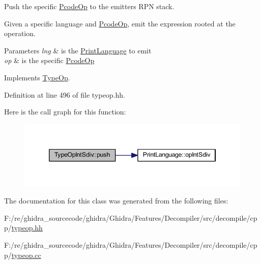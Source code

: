 Push the specific \mbox{\hyperlink{class_pcode_op}{Pcode\+Op}} to the emitter\textquotesingle{}s R\+PN stack. 

Given a specific language and \mbox{\hyperlink{class_pcode_op}{Pcode\+Op}}, emit the expression rooted at the operation. 
\begin{DoxyParams}{Parameters}
{\em lng} & is the \mbox{\hyperlink{class_print_language}{Print\+Language}} to emit \\
\hline
{\em op} & is the specific \mbox{\hyperlink{class_pcode_op}{Pcode\+Op}} \\
\hline
\end{DoxyParams}


Implements \mbox{\hyperlink{class_type_op_ac9c9544203ed74dabe6ac662b653b2af}{Type\+Op}}.



Definition at line 496 of file typeop.\+hh.

Here is the call graph for this function\+:
\nopagebreak
\begin{figure}[H]
\begin{center}
\leavevmode
\includegraphics[width=346pt]{class_type_op_int_sdiv_af19cd2db72cf1781f488d2a8c930b015_cgraph}
\end{center}
\end{figure}


The documentation for this class was generated from the following files\+:\begin{DoxyCompactItemize}
\item 
F\+:/re/ghidra\+\_\+sourcecode/ghidra/\+Ghidra/\+Features/\+Decompiler/src/decompile/cpp/\mbox{\hyperlink{typeop_8hh}{typeop.\+hh}}\item 
F\+:/re/ghidra\+\_\+sourcecode/ghidra/\+Ghidra/\+Features/\+Decompiler/src/decompile/cpp/\mbox{\hyperlink{typeop_8cc}{typeop.\+cc}}\end{DoxyCompactItemize}
